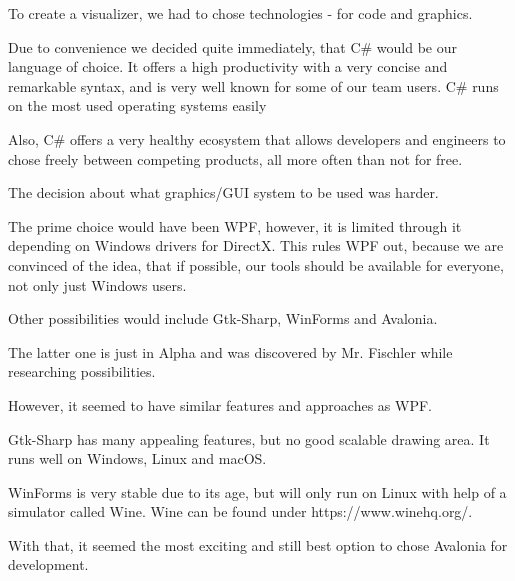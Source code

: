 To create a visualizer, we had to chose technologies - for code and graphics.

Due to convenience we decided quite immediately, that C\# would be our language of choice.
It offers a high productivity with a very concise and remarkable syntax, and is very well known for some of our team users. C\# runs on the most used operating systems easily

Also, C\# offers a very healthy ecosystem that allows developers and engineers to chose freely between competing products, all more often than not for free.

The decision about what graphics/GUI system to be used was harder.

The prime choice would have been WPF, however, it is limited through it depending on Windows drivers for DirectX.
This rules WPF out, because we are convinced of the idea, that if possible, our tools should be available for everyone, not only just Windows users.

Other possibilities would include Gtk-Sharp, WinForms and Avalonia.

The latter one is just in Alpha and was discovered by Mr. Fischler while researching possibilities.

However, it seemed to have similar features and approaches as WPF.

Gtk-Sharp has many appealing features, but no good scalable drawing area. It runs well on Windows, Linux and macOS.

WinForms is very stable due to its age, but will only run on Linux with help of a simulator called Wine. Wine can be found under https://www.winehq.org/.

With that, it seemed the most exciting and still best option to chose Avalonia for development.

